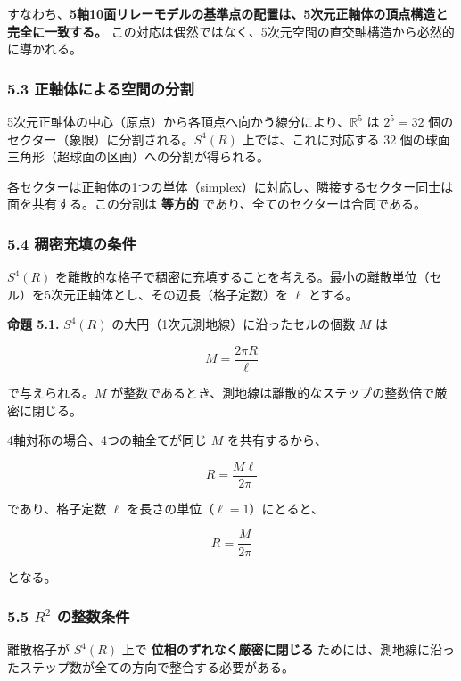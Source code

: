 \documentclass[a4paper,11pt]{ltjsarticle}
\begin{document}
すなわち、\textbf{5軸10面リレーモデルの基準点の配置は、5次元正軸体の頂点構造と完全に一致する。}
この対応は偶然ではなく、5次元空間の直交軸構造から必然的に導かれる。

\subsubsection{5.3
正軸体による空間の分割}\label{ux6b63ux8ef8ux4f53ux306bux3088ux308bux7a7aux9593ux306eux5206ux5272}

5次元正軸体の中心（原点）から各頂点へ向かう線分により、\(\mathbb{R}^5\)
は \(2^5 = 32\) 個のセクター（象限）に分割される。\(S^4(R)\)
上では、これに対応する \(32\)
個の球面三角形（超球面の区画）への分割が得られる。

各セクターは正軸体の1つの単体（simplex）に対応し、隣接するセクター同士は面を共有する。この分割は
\textbf{等方的} であり、全てのセクターは合同である。

\subsubsection{5.4
稠密充填の条件}\label{ux7a20ux5bc6ux5145ux586bux306eux6761ux4ef6}

\(S^4(R)\)
を離散的な格子で稠密に充填することを考える。最小の離散単位（セル）を5次元正軸体とし、その辺長（格子定数）を
\(\ell\) とする。

\textbf{命題 5.1.} \(S^4(R)\) の大円（1次元測地線）に沿ったセルの個数
\(M\) は

\[M = \frac{2\pi R}{\ell}\]

で与えられる。\(M\)
が整数であるとき、測地線は離散的なステップの整数倍で厳密に閉じる。

4軸対称の場合、4つの軸全てが同じ \(M\) を共有するから、

\[R = \frac{M \ell}{2\pi}\]

であり、格子定数 \(\ell\) を長さの単位（\(\ell = 1\)）にとると、

\[R = \frac{M}{2\pi}\]

となる。

\subsubsection{\texorpdfstring{5.5 \(R^2\)
の整数条件}{5.5 R\^{}2 の整数条件}}\label{r2-ux306eux6574ux6570ux6761ux4ef6}

離散格子が \(S^4(R)\) 上で \textbf{位相のずれなく厳密に閉じる}
ためには、測地線に沿ったステップ数が全ての方向で整合する必要がある。
\end{document}
